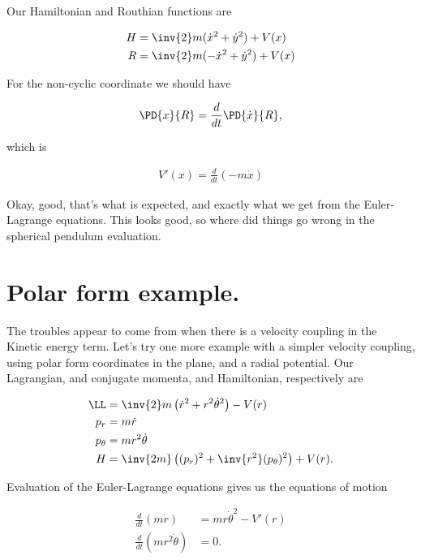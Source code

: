 Our Hamiltonian and Routhian functions are

\begin{align}\label{eqn:goldsteinRouth:21}
H &= \inv{2} m (\dot{x}^2 + \dot{y}^2 ) + V(x) \\
R &= \inv{2} m (-\dot{x}^2 + \dot{y}^2 ) + V(x) 
\end{align}

For the non-cyclic coordinate we should have

\begin{align}\label{eqn:goldsteinRouth:22}
\PD{x}{R} = \frac{d}{dt} \PD{\dot{x}}{R},
\end{align}

which is

\begin{align}\label{eqn:goldsteinRouth:23}
V'(x) = \frac{d}{dt}\left( - m \dot{x} \right)
\end{align}

Okay, good, that's what is expected, and exactly what we get from the Euler-Lagrange equations.  This looks good, so where did things go wrong in the spherical pendulum evaluation.

\section{Polar form example.}

The troubles appear to come from when there is a velocity coupling in the Kinetic energy term.  Let's try one more example with a simpler velocity coupling, using polar form coordinates in the plane, and a radial potential.  Our Lagrangian, and conjugate momenta, and Hamiltonian, respectively are

\begin{align}\label{eqn:goldsteinRouth:30}
\LL &= \inv{2} m \left(\dot{r}^2 + r^2 \dot{\theta}^2 \right) - V(r) \\
p_r &= m \dot{r} \\
p_\theta &= m r^2 \dot{\theta} \\
H &= \inv{2 m} \left((p_r)^2 + \inv{r^2} (p_\theta)^2 \right) + V(r).
\end{align}

Evaluation of the Euler-Lagrange equations gives us the equations of motion

\begin{align}\label{eqn:goldsteinRouth:31}
\frac{d}{dt}\left( m \dot{r} \right) &= m r \dot{\theta}^2 - V'(r) \\
\frac{d}{dt}\left( m r^2 \dot{\theta} \right) &= 0.
\end{align}

